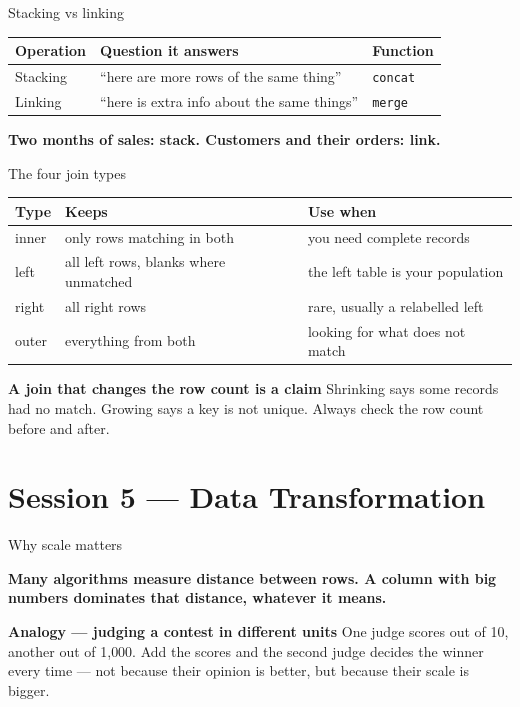 \documentclass[10pt,aspectratio=169]{beamer}
\newcommand{\keyidea}[1]{%
  \begin{block}{}
  \centering\Large\bfseries\color{dsblue} #1
  \end{block}%
}
\newcommand{\trapbox}[2]{%
  \begin{alertblock}{\textbf{#1}}
  #2
  \end{alertblock}%
}
\newcommand{\analogybox}[2]{%
  \begin{exampleblock}{\textbf{Analogy --- #1}}
  #2
  \end{exampleblock}%
}
\begin{document}
\begin{frame}{Stacking vs linking}
\begin{table}
\small
\begin{tabularx}{\linewidth}{@{}lXl@{}}
\toprule
\textbf{Operation} & \textbf{Question it answers} & \textbf{Function} \\
\midrule
Stacking & ``here are more rows of the same thing'' & \texttt{concat} \\
Linking & ``here is extra info about the same things'' & \texttt{merge} \\
\bottomrule
\end{tabularx}
\end{table}
\vspace{0.3cm}
\keyidea{Two months of sales: stack. Customers and their orders: link.}
\end{frame}

\begin{frame}{The four join types}
\begin{table}
\small
\begin{tabularx}{\linewidth}{@{}lXX@{}}
\toprule
\textbf{Type} & \textbf{Keeps} & \textbf{Use when} \\
\midrule
inner & only rows matching in both & you need complete records \\
left & all left rows, blanks where unmatched & the left table is your population \\
right & all right rows & rare, usually a relabelled left \\
outer & everything from both & looking for what does not match \\
\bottomrule
\end{tabularx}
\end{table}
\trapbox{A join that changes the row count is a claim}{Shrinking says some records had no match. Growing says a key is not unique. Always check the row count before and after.}
\end{frame}

\section{Session 5 --- Data Transformation}

\begin{frame}{Why scale matters}
\keyidea{Many algorithms measure distance between rows. A column with big numbers dominates that distance, whatever it means.}
\analogybox{judging a contest in different units}{One judge scores out of 10, another out of 1{,}000. Add the scores and the second judge decides the winner every time --- not because their opinion is better, but because their scale is bigger.}
\end{frame}
\end{document}
